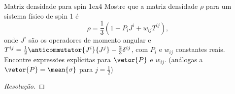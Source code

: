 \begin{exercício}{Matriz densidade para spin 1}{ex4}
    Mostre que a matriz densidade \(\rho\) para um sistema físico de spin 1 é
    \begin{equation*}
        \rho = \frac13 \left(1 + P_iJ^i  + w_{ij} T^{ij}\right),
    \end{equation*}
    onde \(J^i\) são os operadores de momento angular e \(T^{ij} = \frac12\anticommutator{J^i}{J^j} - \frac23 \delta^{ij}\), com \(P_i\) e \(w_{ij}\) constantes reais. Encontre expressões explícitas para \(\vetor{P}\) e \(w_{ij}\). (análogas a \(\vetor{P} = \mean{\sigma}\) para \(j = \frac12\))
\end{exercício}
\begin{proof}[Resolução]
    
\end{proof}
